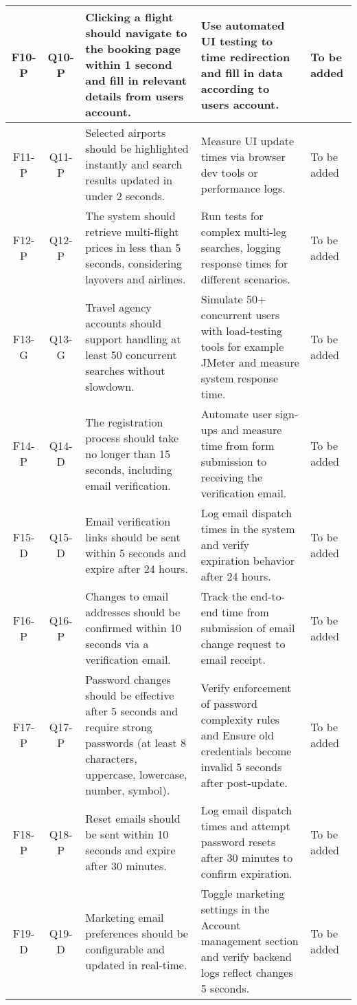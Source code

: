 \begin{longtable}{|c|c|p{4.5cm}|p{3.5cm}|p{3.5cm}|}
    \hline
    F10-P & Q10-P & Clicking a flight should navigate to the booking page within 1 second and fill in relevant details from users account. & Use automated UI testing to time redirection and fill in data according to users account. & To be added \\
    \hline
    F11-P & Q11-P & Selected airports should be highlighted instantly and search results updated in under 2 seconds. & Measure UI update times via browser dev tools or performance logs. & To be added \\
    \hline
    F12-P & Q12-P & The system should retrieve multi-flight prices in less than 5 seconds, considering layovers and airlines. & Run tests for complex multi-leg searches, logging response times for different scenarios. & To be added \\
    \hline
    F13-G & Q13-G & Travel agency accounts should support handling at least 50 concurrent searches without slowdown. & Simulate 50+ concurrent users with load-testing tools for example JMeter and measure system response time. & To be added \\
    \hline
    F14-P & Q14-D & The registration process should take no longer than 15 seconds, including email verification. & Automate user sign-ups and measure time from form submission to receiving the verification email. & To be added \\
    \hline
    F15-D & Q15-D & Email verification links should be sent within 5 seconds and expire after 24 hours. & Log email dispatch times in the system and verify expiration behavior after 24 hours. & To be added \\
    \hline
    F16-P & Q16-P & Changes to email addresses should be confirmed within 10 seconds via a verification email. & Track the end-to-end time from submission of email change request to email receipt. & To be added \\
    \hline
    F17-P & Q17-P & Password changes should be effective after 5 seconds and require strong passwords (at least 8 characters, uppercase, lowercase, number, symbol). & Verify enforcement of password complexity rules and Ensure old credentials become invalid 5 seconds after post-update. & To be added \\
    \hline
    F18-P & Q18-P & Reset emails should be sent within 10 seconds and expire after 30 minutes. & Log email dispatch times and attempt password resets after 30 minutes to confirm expiration. & To be added \\
    \hline
    F19-D & Q19-D & Marketing email preferences should be configurable and updated in real-time. & Toggle marketing settings in the Account management section and verify backend logs reflect changes 5 seconds. & To be added \\

\end{longtable}
